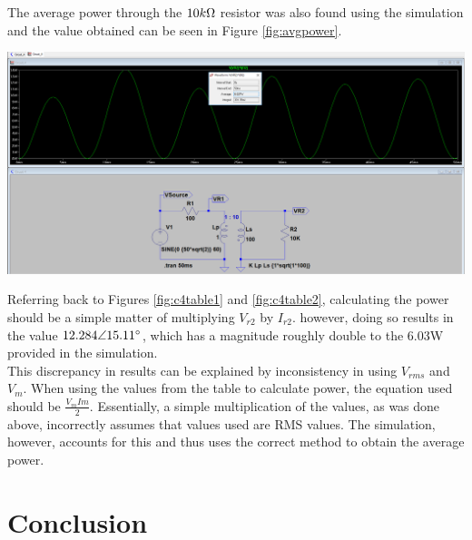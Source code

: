 \documentclass[journal]{IEEEtran}
\begin{document}
\noindent The average power through the $10k\ohm$ resistor was also found using the simulation and the value obtained can be seen in Figure \ref{fig:avgpower}. 

\begingroup
    \centering
    \medskip
    \includegraphics[width=\columnwidth]{images/labx_8.png}
    \label{fig:avgpower}
    \medskip
\endgroup

\noindent Referring back to Figures \ref{fig:c4table1} and \ref{fig:c4table2}, calculating the power should be a simple matter of multiplying  $V_{r2}$ by  $I_{r2}$. however, doing so results in the value $12.284\angle15.11\degree$, which has a magnitude roughly double to the 6.03W provided in the simulation.\\

\noindent This discrepancy in results can be explained by inconsistency in using $V_{rms}$ and $V_{m}$. When using the values from the table to calculate power, the equation used should be $\frac{V_{m}I{m}}{2}$. Essentially, a simple multiplication of the values, as was done above, incorrectly assumes that values used are RMS values. The simulation, however, accounts for this and thus uses the correct method to obtain the average power. 

\section{Conclusion}
\end{document}
